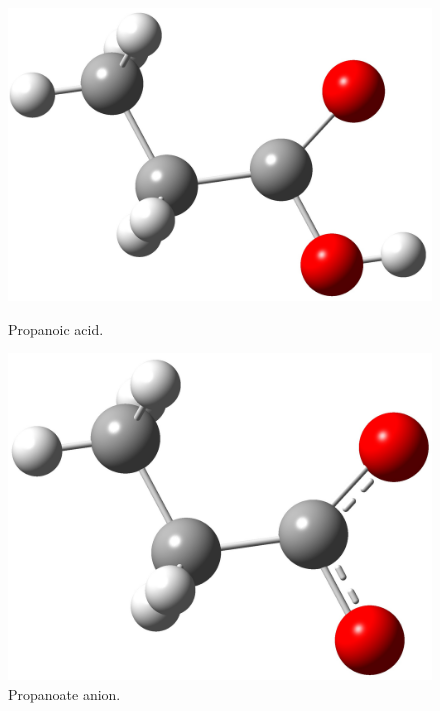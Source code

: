 \documentclass[twocolumn]{article}
\begin{document}
\begin{figure}[h!]
\begin{minipage}[b]{0.225\textwidth}
            \centering
          \includegraphics[scale=0.07]{propanoicAcid.jpg}
          \caption{Propanoic acid.}
        \end{minipage}
        \hfill
        \begin{minipage}[b]{0.225\textwidth}
          \centering
          \includegraphics[scale=0.08]{propanoate.jpg}
          \caption{Propanoate anion.}
        \end{minipage}
        \centering
        \begin{minipage}[b]{0.225\textwidth}
            \centering

\end{minipage}
\end{figure}
\end{document}
